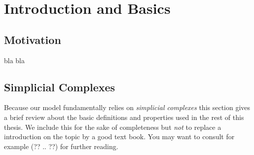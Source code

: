 \chapter{Introduction and Basics}
%
\section{Motivation}
bla bla  %


\section{Simplicial Complexes}
Because our model fundamentally relies on \emph{simplicial complexes}
this section gives a brief review about the basic definitions and properties
used in the rest of this thesis. We include this for the sake of completeness
but \emph{not} to replace a introduction on the topic by a good text book.
You may want to consult for example (?? .. ??) %
for further reading.
 

